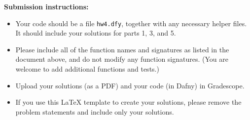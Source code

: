 \documentclass{article}
\begin{document}
\noindent
\textbf{Submission instructions:}
\begin{itemize}
\item Your code should be a file \texttt{hw4.dfy}, together with any necessary helper files.
It should include your solutions for parts 1, 3, and 5.
\item Please include all of the function names and signatures as listed in the document above,
and do not modify any function signatures. (You are welcome to add additional functions and tests.)
\item Upload your solutions (as a PDF) and your code (in Dafny) in Gradescope.
\item If you use this LaTeX template to create your solutions, please remove the problem statements and include only your solutions.
\end{itemize}
\end{document}
